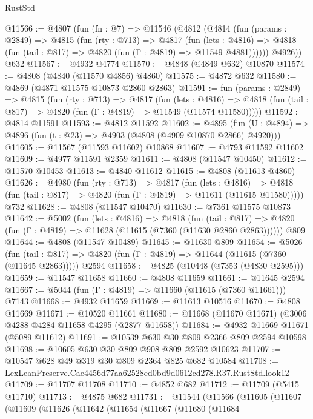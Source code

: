 \begin{lexlean}{RustStd}
\begin{coremodule}
@11566 := @4807
    (fun (fn : @7) =>
    @11546
      (@4812
        (@4814
          (fun (params : @2849) =>
          @4815
            (fun (rty : @713) =>
            @4817
              (fun (lets : @4816) =>
              @4818 (fun (tail : @817) => @4820 (fun (Γ : @4819) => @11549 @4881))))))
        @4926))
    @632
@11567 := @4932 @4774
@11570 := @4848 (@4849 @632) @10870
@11574 := @4808 (@4840 (@11570 @4856) @4860)
@11575 := @4872 @632
@11580 := @4869 (@4871 @11575 @10873 @2860 @2863)
@11591 := fun (params : @2849) =>
  @4815
    (fun (rty : @713) =>
    @4817
      (fun (lets : @4816) =>
      @4818 (fun (tail : @817) => @4820 (fun (Γ : @4819) => @11549 (@11574 @11580)))))
@11592 := @4814 @11591
@11593 := @4812 @11592
@11602 := @4895
    (fun (U : @4894) => @4896 (fun (t : @23) => @4903 (@4808 (@4909 @10870 @2866) @4920)))
@11605 := @11567 (@11593 @11602) @10868
@11607 := @4793 @11592 @11602
@11609 := @4977 @11591 @2359
@11611 := @4808 (@11547 @10450)
@11612 := @11570 @10453
@11613 := @4840 @11612
@11615 := @4808 (@11613 @4860)
@11626 := @4980
    (fun (rty : @713) =>
    @4817
      (fun (lets : @4816) =>
      @4818 (fun (tail : @817) => @4820 (fun (Γ : @4819) => @11611 (@11615 @11580)))))
    @732
@11628 := @4808 (@11547 @10470)
@11630 := @7361 @11575 @10873
@11642 := @5002
    (fun (lets : @4816) =>
    @4818
      (fun (tail : @817) =>
      @4820 (fun (Γ : @4819) => @11628 (@11615 (@7360 (@11630 @2860 @2863))))))
    @809
@11644 := @4808 (@11547 @10489)
@11645 := @11630 @809
@11654 := @5026
    (fun (tail : @817) => @4820 (fun (Γ : @4819) => @11644 (@11615 (@7360 (@11645 @2863)))))
    @2594
@11658 := @4825 (@10448 (@7353 (@4830 @2595)))
@11659 := @11547 @11658
@11660 := @4808 @11659
@11661 := @11645 @2594
@11667 := @5044 (fun (Γ : @4819) => @11660 (@11615 (@7360 @11661))) @7143
@11668 := @4932 @11659
@11669 := @11613 @10516
@11670 := @4808 @11669
@11671 := @10520 @11661
@11680 := @11668 (@11670 @11671) (@3006 @4288 @4284 @11658 @4295 (@2877 @11658))
@11684 := @4932 @11669 @11671 (@5089 @11612)
@11691 := @10539 @630 @30 @809 @2366 @809 @2594 @10598
@11698 := @10605 @630 @30 @809 @908 @809 @2592 @10623
@11707 := @10547 @628 @49 @319 @30 @809 @2364 @825 @682 @10584
@11708 := LexLeanPreserve.Cae4456d77aa62528ed0bd9d0612cd278.R37.RustStd.look12
@11709 := @11707 @11708
@11710 := @4852 @682
@11712 := @11709 (@5415 @11710)
@11713 := @4875 @682
@11731 := @11544
    (@11566
      (@11605
        (@11607
          (@11609
            (@11626
              (@11642
                (@11654
                  (@11667
                    (@11680
                      (@11684

\end{coremodule}
\end{lexlean}
